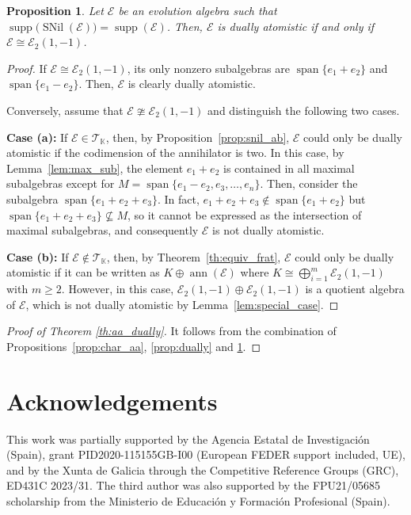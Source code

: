 \documentclass[12pt,reqno]{amsart}
\newtheorem{proposition}[theorem]{Proposition}
\theoremstyle{definition}
\theoremstyle{remark}
\DeclareMathOperator{\ann}{ann}
\DeclareMathOperator{\spa}{span}
\DeclareMathOperator{\supp}{supp}
\DeclareMathOperator{\snil}{SNil}
\numberwithin{equation}{section}
\begin{document}
\begin{proposition}\label{prop:dually_tk}
	Let $\mathcal{E}$ be an evolution algebra such that $\supp\big(\snil(\mathcal{E})\big)=\supp(\mathcal{E})$. Then, $\mathcal{E}$ is dually atomistic if and only if $\mathcal{E}\cong\mathcal{E}_2(1,-1)$.
\end{proposition}
\begin{proof}
	If $\mathcal{E}\cong\mathcal{E}_2(1,-1)$, its only nonzero subalgebras are $\spa\{e_1+e_2\}$ and $\spa\{e_1-e_2\}$. Then, $\mathcal{E}$ is clearly dually atomistic.
	
	Conversely, assume that $\mathcal{E}\ncong\mathcal{E}_2(1,-1)$ and distinguish the following two cases.
	
	\textbf{Case (a):} If $\mathcal{E}\in\mathcal{T}_\mathbb{K}$, then, by Proposition~\ref{prop:snil_ab}, $\mathcal{E}$ could only be dually atomistic if the codimension of the annihilator is two. In this case, by Lemma~\ref{lem:max_sub}, the element $e_1+e_2$ is contained in all maximal subalgebras except for $M=\spa\{e_1-e_2,e_3,\dots,e_n\}$. Then, consider the subalgebra $\spa\{e_1+e_2+e_3\}$.
	In fact, $e_1+e_2+e_3\notin\spa\{e_1+e_2\}$ but $\spa\{e_1+e_2+e_3\}\nsubseteq M$, so it cannot be expressed as the intersection of maximal subalgebras, and consequently $\mathcal{E}$ is not dually atomistic.
	
	\textbf{Case (b):} If $\mathcal{E}\notin\mathcal{T}_\mathbb{K}$, then, by Theorem~\ref{th:equiv_frat}, $\mathcal{E}$ could only be dually atomistic if it can be written as $K\oplus\ann(\mathcal{E})$ where $K\cong\bigoplus_{i=1}^m\mathcal{E}_2(1,-1)$ with $m\geq2$. However, in this case, $\mathcal{E}_2(1,-1) \oplus \mathcal{E}_2(1,-1)$ is a quotient algebra of $\mathcal{E}$, which is not dually atomistic by Lemma~\ref{lem:special_case}.
\end{proof}
\begin{proof}[Proof of Theorem \ref{th:aa_dually}]
	It follows from the combination of Propositions~\ref{prop:char_aa}, \ref{prop:dually} and \ref{prop:dually_tk}.
\end{proof}


\section*{Acknowledgements}
This work was partially supported by the Agencia Estatal de Investigaci\'on (Spain),
grant PID2020-115155GB-I00 (European FEDER support included, UE), and
by the Xunta de Galicia through the Competitive Reference Groups (GRC), ED431C
2023/31.
The third author was also supported by the FPU21/05685 scholarship from the Ministerio de Educaci\'on y Formaci\'on Profesional (Spain).
\end{document}
